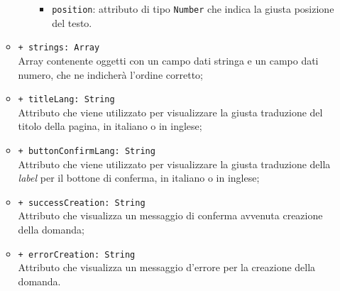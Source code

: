 \begin{itemize}
\begin{itemize}
\begin{itemize}
\begin{itemize}
				\item \texttt{position}: attributo di tipo \texttt{Number} che indica la giusta posizione del testo.
			\end{itemize}
		\end{itemize}	
		\item \texttt{+ strings: Array} \\ Array contenente oggetti con un campo dati stringa e un campo dati numero, che ne indicherà l'ordine corretto;  
		\item \texttt{+ titleLang: String} \\ Attributo che viene utilizzato per visualizzare la giusta traduzione del titolo della pagina, in italiano o in inglese;
		\item \texttt{+ buttonConfirmLang: String} \\ Attributo che viene utilizzato per visualizzare la giusta traduzione della \textit{label} per il bottone di conferma, in italiano o in inglese;
		\item \texttt{+ successCreation: String} \\ Attributo che visualizza un messaggio di conferma avvenuta creazione della domanda;
		\item \texttt{+ errorCreation: String} \\ Attributo che visualizza un messaggio d'errore per la creazione della domanda.
	\end{itemize}
\end{itemize}


